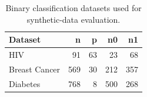 \begin{table}
\caption{Binary classification datasets used for synthetic-data evaluation.}
\label{tab:datasets}
\begin{tabular}{lrrrr}
\toprule
Dataset & n & p & n0 & n1 \\
\midrule
HIV & 91 & 63 & 23 & 68 \\
Breast Cancer & 569 & 30 & 212 & 357 \\
Diabetes & 768 & 8 & 500 & 268 \\
\bottomrule
\end{tabular}
\end{table}
